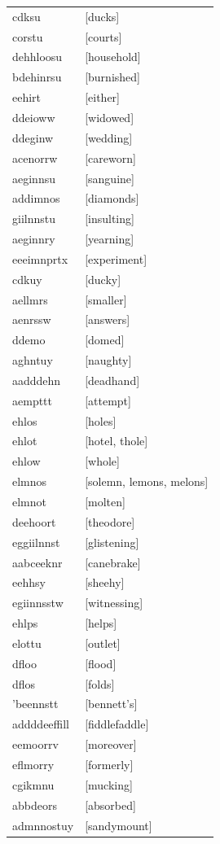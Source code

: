 \documentclass{article}
\begin{document}
\begin{tabular}{ll}
cdksu & [ducks] \\
corstu & [courts] \\
dehhloosu & [household] \\
bdehinrsu & [burnished] \\
eehirt & [either] \\
ddeioww & [widowed] \\
ddeginw & [wedding] \\
acenorrw & [careworn] \\
aeginnsu & [sanguine] \\
addimnos & [diamonds] \\
giilnnstu & [insulting] \\
aeginnry & [yearning] \\
eeeimnprtx & [experiment] \\
cdkuy & [ducky] \\
aellmrs & [smaller] \\
aenrssw & [answers] \\
ddemo & [domed] \\
aghntuy & [naughty] \\
aadddehn & [deadhand] \\
aempttt & [attempt] \\
ehlos & [holes] \\
ehlot & [hotel, thole] \\
ehlow & [whole] \\
elmnos & [solemn, lemons, melons] \\
elmnot & [molten] \\
deehoort & [theodore] \\
eggiilnnst & [glistening] \\
aabceeknr & [canebrake] \\
eehhsy & [sheehy] \\
egiinnsstw & [witnessing] \\
ehlps & [helps] \\
elottu & [outlet] \\
dfloo & [flood] \\
dflos & [folds] \\
'beennstt & [bennett's] \\
addddeeffill & [fiddlefaddle] \\
eemoorrv & [moreover] \\
eflmorry & [formerly] \\
cgikmnu & [mucking] \\
abbdeors & [absorbed] \\
admnnostuy & [sandymount] \\

\end{tabular}
\end{document}
